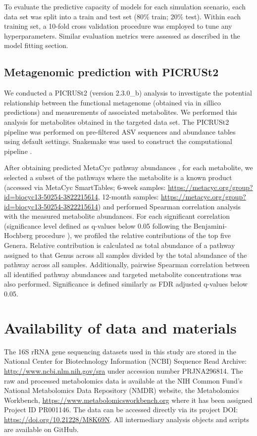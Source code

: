 To evaluate the predictive capacity of models for each simulation scenario, each data set was split into a train and test set (80\% train; 20\% test). Within each training set, a 10-fold cross validation procedure was employed to tune any hyperparameters. Similar evaluation metrics were assessed as described in the model fitting section. 

\subsection{Metagenomic prediction with PICRUSt2}

We conducted a PICRUSt2 (version 2.3.0\_b) \cite{douglas2020picrust2} analysis to investigate the potential relationship between the functional metagenome (obtained via in sillico predictions) and measurements of associated metabolites. We performed this analysis for metabolites obtained in the targeted data set. The PICRUSt2 pipeline was performed on pre-filtered ASV sequences and abundance tables using default settings. Snakemake was used to construct the computational pipeline \cite{molder2021sustainable}.  

After obtaining predicted MetaCyc pathway abundances \cite{caspi2020metacyc}, for each metabolite, we selected a subset of the pathways where the metabolite is a known product (accessed via MetaCyc SmartTables; 6-week samples: \url{https://metacyc.org/group?id=biocyc13-50254-3822215614}, 12-month samples: \url{https://metacyc.org/group?id=biocyc13-50254-3822215614}) and performed Spearman correlation analysis with the measured metabolite abundances. For each significant correlation (significance level defined as q-values below 0.05 following the Benjamini-Hochberg procedure \cite{benjamini1995controlling}), we profiled the relative contributions of the top five Genera. Relative contribution is calculated as total abundance of a pathway assigned to that Genus across all samples divided by the total abundance of the pathway across all samples. 
Additionally, pairwise Spearman correlation between all identified pathway abundances and targeted metabolite concentrations was also performed. Significance is defined similarly as FDR adjusted q-values below 0.05.    

\section{Availability of data and materials}

The 16S rRNA gene sequencing datasets used in this study are stored in the National Center for Biotechnology Information (NCBI) Sequence Read Archive: \url{http://www.ncbi.nlm.nih.gov/sra} under accession number PRJNA296814. The raw and processed metabolomics data is available at the NIH Common Fund's National Metabolomics Data Repository (NMDR) website, the Metabolomics Workbench, \url{https://www.metabolomicsworkbench.org} where it has been assigned Project ID PR001146. The data can be accessed directly via its project DOI: \url{https://doi.org/10.21228/M8K69N}. All intermediary analysis objects and scripts are available on GitHub. 